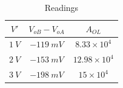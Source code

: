 \documentclass[12pt]{article}
\begin{document}
\begin{table}[!hbt]
	\begin{center}
	\caption{Readings\\}
	\begin{tabular}{|c|c|c|}
		\hline
		$V'$ & $V_{oB}-V_{oA}$ & $A_{OL}$\\
		\hline
        $1\ V$ & $-119\ mV$ & $8.33\times10^4$\\
		\hline
        $2\ V$ & $-153\ mV$ & $12.98\times10^4$\\
		\hline
        $3\ V$ & $-198\ mV$ & $15\times10^4$\\
		\hline
	\end{tabular}
	\end{center}
\end{table}
\end{document}
